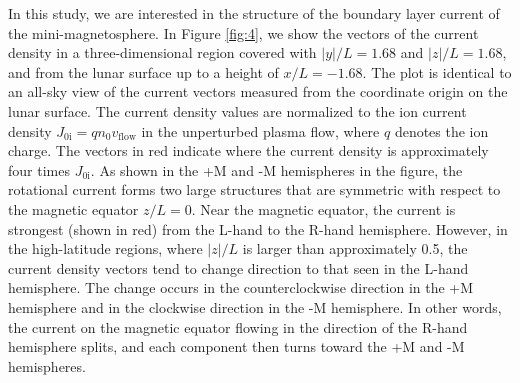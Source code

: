 \documentclass[draft,jgrga]{agutex2015}
\begin{document}
\begin{article}
In this study, 
we are interested in the structure of the boundary layer current  
of the mini-magnetosphere.
In Figure \ref{fig:4}, 
we show the vectors of the current density in a three-dimensional region 
covered with $|y|/L=1.68$ and $|z|/L=1.68$, and 
from the lunar surface up to a height of $x/L = -1.68$.
The plot is identical to an all-sky view of the current vectors
measured from the coordinate origin on the lunar surface. 
The current density values are normalized to 
the ion current density $J_\mathrm{0i}=qn_{0}v_{\mathrm{flow}}$
in the unperturbed plasma flow, where $q$ denotes the ion charge.
The vectors in red indicate where the current density is 
approximately four times $J_\mathrm{0i}$.
As shown in the +M and -M hemispheres in the figure, 
the rotational current forms two large structures that are
symmetric with respect to the magnetic equator $z/L=0$. 
Near the magnetic equator, the current is strongest (shown in red) from the L-hand to the R-hand hemisphere.
However, in the high-latitude regions, where $|z|/L$ is larger than approximately 0.5,   
the current density vectors tend to 
change direction to that seen in the L-hand hemisphere. 
The change occurs in the counterclockwise direction 
in the +M hemisphere and in the clockwise direction in the -M hemisphere.
In other words, the current on the magnetic equator flowing in the direction of 
the R-hand hemisphere splits, and each component then turns toward
the +M and -M hemispheres.


\end{article}
\end{document}
